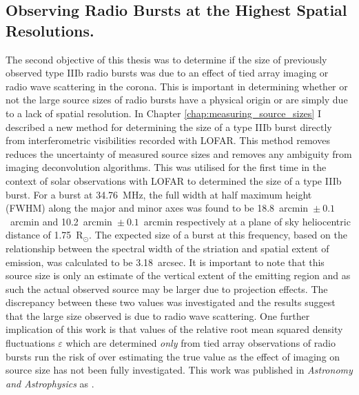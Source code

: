 \subsection{Observing Radio Bursts at the Highest Spatial Resolutions.}
The second objective of this thesis was to determine if the size of previously observed type IIIb radio bursts was due to an effect of tied array imaging or radio wave scattering in the corona. 
This is important in determining whether or not the large source sizes of radio bursts have a physical origin or are simply due to a lack of spatial resolution. 
In Chapter \ref{chap:measuring_source_sizes} I described a new method for determining the size of a type IIIb burst directly from interferometric visibilities recorded with LOFAR. This method removes reduces the uncertainty of measured source sizes and removes any ambiguity from imaging deconvolution algorithms.
This was utilised for the first time in the context of solar observations with LOFAR to determined the size of a type IIIb burst. For a burst at 34.76~MHz, the full width at half maximum height (FWHM) along the major and minor axes was found to be 18.8~arcmin~$\pm~0.1$~arcmin and 10.2~arcmin~$\pm~0.1$~arcmin respectively at a plane of sky heliocentric distance of 1.75~R$_\odot$. The expected size of a burst at this frequency, based on the relationship between the spectral width of the striation and spatial extent of emission, was calculated to be 3.18~arcsec. It is important to note that this source size is only an estimate of the vertical extent of the emitting region and as such the actual observed source may be larger due to projection effects. The discrepancy between these two values was investigated and the results suggest that the large size observed is due to radio wave scattering. One further implication of this work is that values of the relative root mean squared density fluctuations $\varepsilon$ which are determined \textit{only} from tied array observations of radio bursts run the risk of over estimating the true value as the effect of imaging on source size has not been fully investigated. This work was published in \textit{Astronomy and Astrophysics} as \cite{Murphy2021}. 

